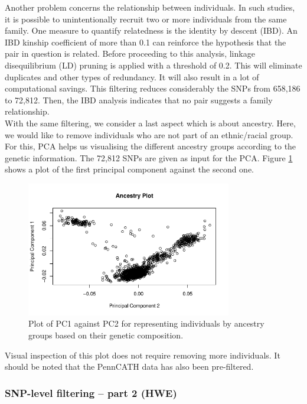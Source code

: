 \documentclass[a4paper, 12pt]{article}
\begin{document}
Another problem concerns the relationship between individuals. In such studies, it is possible to unintentionally recruit two or more individuals from the same family. One measure to quantify relatedness is the identity by descent (IBD). An IBD kinship coefficient of more than 0.1 can reinforce the hypothesis that the pair in question is related. Before proceeding to this analysis, linkage disequilibrium (LD) pruning is applied with a threshold of 0.2. This will eliminate duplicates and other types of redundancy. It will also result in a lot of computational savings. This filtering reduces considerably the SNPs from 658,186 to 72,812. Then, the IBD analysis indicates that no pair suggests a family relationship. \\
With the same filtering, we consider a last aspect which is about ancestry. Here, we would like to remove individuals who are not part of an ethnic/racial group. For this, PCA helps us visualising the different ancestry groups according to the genetic information. The 72,812 SNPs are given as input for the PCA. Figure \ref{fig:PCA} shows a plot of the first principal component against the second one. \\

\begin{figure}[!ht]
\centering
\includegraphics[width=0.8\textwidth]{../Plots/PCA}
\caption{Plot of PC1 against PC2 for representing individuals by ancestry groups based on their genetic composition.}
\label{fig:PCA}
\end{figure}

Visual inspection of this plot does not require removing more individuals. It should be noted that the PennCATH data has also been pre-filtered. 

\subsubsection*{SNP-level filtering -- part 2 (HWE)}
\end{document}

